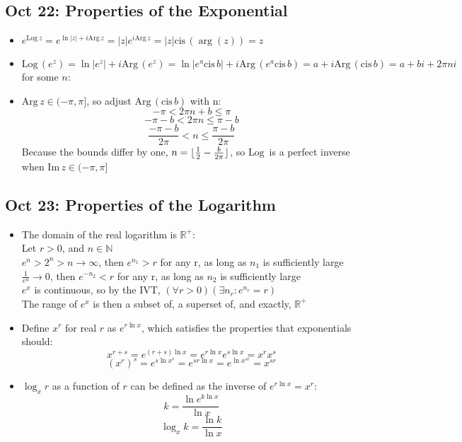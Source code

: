 \documentclass[10pt, oneside]{article}
\let\leq\leqslant
\newcommand{\R}{\mathbb{R}}
\newcommand{\N}{\mathbb{N}}
\DeclarePairedDelimiter\floor{\lfloor}{\rfloor}
\newcommand{\cis}{\text{cis} \,}
\renewcommand{\Im}{\text{Im} \,}
\newcommand{\Arg}{\text{Arg} \,}
\newcommand{\Log}{\text{Log} \,}
\begin{document}
\subsection{Oct 22: Properties of the Exponential}
\begin{itemize}
    \item $e^{\Log z} = e^{\ln|z| + i \Arg z} = |z| e^{i \Arg z} = |z| \cis(\arg(z)) = z$
    \item $\Log(e^z) = \ln|e^z| + i \Arg(e^z) = \ln|e^a \cis b| + i \Arg (e^a \cis b) = a + i \Arg(\cis b) = a + bi + 2\pi n i$ for some $n$:
    \item $\Arg z \in (-\pi,\pi]$, so adjust $\Arg(\cis b)$ with n:
        \[-\pi < 2\pi n + b \leq \pi\]
        \[-\pi - b < 2\pi n \leq \pi - b\]
        \[\frac{-\pi - b}{2\pi} < n \leq \frac{\pi - b}{2\pi}\]
        Because the bounds differ by one, $n = \floor{\frac{1}{2} - \frac{b}{2\pi}}$, so $\Log$ is a perfect inverse when $\Im z \in (-\pi,\pi]$
\end{itemize}

\subsection{Oct 23: Properties of the Logarithm}
\begin{itemize}
    \item The domain of the real logarithm is $\R^+$:\\
        Let $r > 0$, and $n \in \N$\\
        $e^n > 2^n > n \rightarrow \infty$, then $e^{n_1} > r$ for any r, as long as $n_1$ is sufficiently large\\
        $\frac{1}{e^n} \rightarrow 0$, then $e^{-n_2} < r$ for any r, as long as $n_2$ is sufficiently large\\
        $e^x$ is continuous, so by the IVT, $(\forall r > 0) (\exists n_r : e^{n_r} = r)$\\
        The range of $e^x$ is then a subset of, a superset of, and exactly, $\R^+$
    \item Define $x^r$ for real $r$ as $e^{r\ln x}$, which satisfies the properties that exponentials should:
        \[x^{r + s} = e^{(r + s) \ln x} = e^{r \ln x} e^{s \ln x} = x^r x^s\]
        \[(x^r)^s = e^{s \ln x^r} = e^{sr \ln x} = e^{\ln x ^{sr}} = x^{sr}\]
    \item $\log_x r$ as a function of $r$ can be defined as the inverse of $e^{r \ln x} = x^r$:
        \[k = \frac{\ln e^{k \ln x}}{\ln x}\]
        \[\log_x k = \frac{\ln k}{\ln x}\]
\end{itemize}
\end{document}
